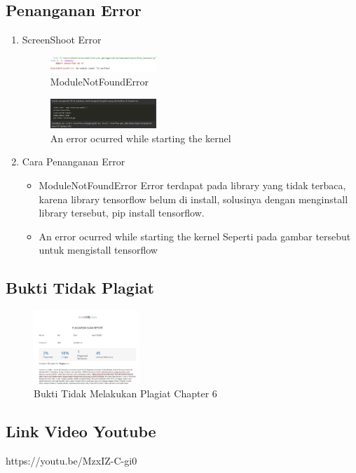 \subsection{Penanganan Error}
\begin{enumerate}
	\item ScreenShoot Error
	\begin{figure}[H]
		\includegraphics[width=4cm]{figures/1174080/6/error/1.PNG}
		\centering
		\caption{ModuleNotFoundError}
	\end{figure}

	\begin{figure}[H]
		\includegraphics[width=4cm]{figures/1174080/6/error/2.PNG}
		\centering
		\caption{An error ocurred while starting the kernel}
	\end{figure}

	\item Cara Penanganan Error
	\begin{itemize}
		\item ModuleNotFoundError
		\hfill\break
		Error terdapat pada library yang tidak terbaca, karena library tensorflow belum di install, solusinya dengan menginstall library tersebut, pip install tensorflow.
		\item An error ocurred while starting the kernel
		\hfill\break
		Seperti pada gambar tersebut untuk mengistall tensorflow
	\end{itemize}
\end{enumerate}

\subsection{Bukti Tidak Plagiat}
\begin{figure}[H]
\centering
	\includegraphics[width=4cm]{figures/1174080/6/materi/plagiat.PNG}
	\caption{Bukti Tidak Melakukan Plagiat Chapter 6}
\end{figure}

\subsection{Link Video Youtube}
https://youtu.be/MzxIZ-C-gi0